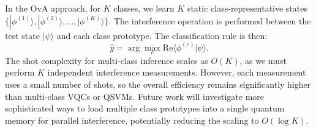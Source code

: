 \documentclass[conference]{IEEEtran}
\begin{document}
In the OvA approach, for $K$ classes, we learn $K$ static class-representative states $\{|\phi^{(1)}\rangle, |\phi^{(2)}\rangle, \dots, |\phi^{(K)}\rangle\}$. The interference operation is performed between the test state $|\psi\rangle$ and each class prototype. The classification rule is then:
\begin{equation}
    \hat{y} = \arg\max_c \mathrm{Re}\langle \phi^{(c)} | \psi \rangle.
\end{equation}
The shot complexity for multi-class inference scales as $O(K)$, as we must perform $K$ independent interference measurements. However, each measurement uses a small number of shots, so the overall efficiency remains significantly higher than multi-class VQCs or QSVMs. Future work will investigate more sophisticated ways to load multiple class prototypes into a single quantum memory for parallel interference, potentially reducing the scaling to $O(\log K)$.
\end{document}
